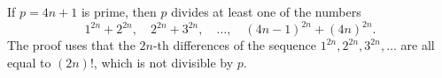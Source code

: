 If $p = 4n + 1$ is prime, then $p$ divides at least one of the numbers
$$1^{2n} + 2^{2n}, \quad 2^{2n} + 3^{2n}, \quad \ldots, \quad (4n-1)^{2n} + (4n)^{2n}.$$
The proof uses that the $2n$-th differences of the sequence $1^{2n}, 2^{2n}, 3^{2n}, \ldots$ are all equal to $(2n)!$, which is not divisible by $p$.
